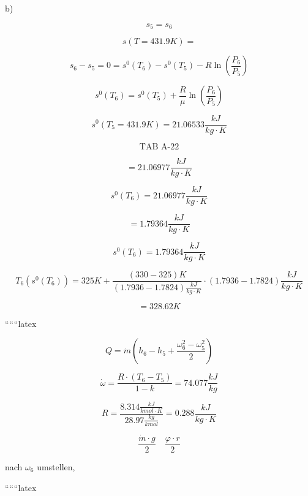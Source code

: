 b)

\[
s_5 = s_6
\]

\[
s(T = 431.9K) =
\]

\[
s_6 - s_5 = 0 = s^0(T_6) - s^0(T_5) - R \ln \left( \frac{P_6}{P_5} \right)
\]

\[
s^0(T_6) = s^0(T_5) + \frac{R}{\mu} \ln \left( \frac{P_6}{P_5} \right)
\]

\[
s^0(T_5 = 431.9K) = 21.06533 \frac{kJ}{kg \cdot K}
\]

\[
\text{TAB A-22}
\]

\[
= 21.06977 \frac{kJ}{kg \cdot K}
\]

\[
s^0(T_6) = 21.06977 \frac{kJ}{kg \cdot K}
\]

\[
= 1.79364 \frac{kJ}{kg \cdot K}
\]

\[
s^0(T_6) = 1.79364 \frac{kJ}{kg \cdot K}
\]

\[
T_6(s^0(T_6)) = 325K + \frac{(330 - 325)K}{(1.7936 - 1.7824) \frac{kJ}{kg \cdot K}} \cdot (1.7936 - 1.7824) \frac{kJ}{kg \cdot K}
\]

\[
= 328.62K
\]

``````latex


\[
Q = \dot{m} \left( h_6 - h_5 + \frac{\omega_6^2 - \omega_5^2}{2} \right)
\]

\[
\dot{\omega} = \frac{R \cdot (T_6 - T_5)}{1 - k} = 74.077 \frac{kJ}{kg}
\]

\[
R = \frac{8.314 \frac{kJ}{kmol \cdot K}}{28.97 \frac{kg}{kmol}} = 0.288 \frac{kJ}{kg \cdot K}
\]

\[
\frac{\dot{m} \cdot g}{2} \quad \frac{\varphi \cdot r}{2}
\]

nach \( \omega_6 \) umstellen,

``````latex